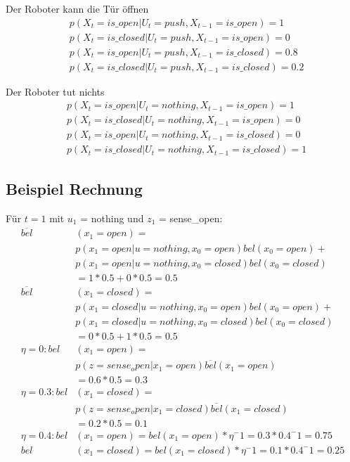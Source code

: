 Der Roboter kann die Tür öffnen
\begin{align*}
	&p(X_t = is\_open | U_t = push, X_{t-1} = is\_open) = 1 \\
	&p(X_t = is\_closed | U_t = push, X_{t-1} = is\_open) = 0 \\
	&p(X_t = is\_open | U_t = push, X_{t-1} = is\_closed) = 0.8 \\
	&p(X_t = is\_closed | U_t = push, X_{t-1} = is\_closed) = 0.2
\end{align*}

Der Roboter tut nichts
\begin{align*}
	&p(X_t = is\_open | U_t = nothing, X_{t-1} = is\_open) = 1 \\
	&p(X_t = is\_closed | U_t = nothing, X_{t-1} = is\_open) = 0 \\
	&p(X_t = is\_open | U_t = nothing, X_{t-1} = is\_closed) = 0 \\
	&p(X_t = is\_closed | U_t = nothing, X_{t-1} = is\_closed) = 1
\end{align*}

\subsection{Beispiel Rechnung}
Für $t=1$ mit $u_1$ = nothing und $z_1$ = sense_open:
\begin{align*}
	\overline{bel}&(x_1 = open) = \\
		&p(x_1 = open | u = nothing, x_0 = open)bel(x_0 = open) + \\
		&p(x_1 = open | u = nothing, x_0 = closed)bel(x_0 = closed) \\
		&= 1 * 0.5 + 0 * 0.5 = 0.5 \\
	\overline{bel}&(x_1 = closed) = \\
		&p(x_1 = closed | u = nothing, x_0 = open)bel(x_0 = open) + \\
		&p(x_1 = closed | u = nothing, x_0 = closed)bel(x_0 = closed) \\
		&= 0 * 0.5 + 1 * 0.5 = 0.5 \\
	\eta = 0: bel&(x_1 = open) =  \\
		&p(z = sense_open | x_1 = open)\overline{bel}(x_1 = open) \\
		&= 0.6 * 0.5 = 0.3 \\
	\eta = 0.3: bel&(x_1 = closed) = \\
		&p(z = sense_open | x_1 = closed)\overline{bel}(x_1 = closed)\\
		&= 0.2 * 0.5 = 0.1 \\
	\eta = 0.4: bel&(x_1 = open) = bel(x_1 = open) * \eta^-1
		= 0.3 * 0.4^-1 = 0.75 \\
	bel&(x_1 = closed) = bel(x_1 = closed) * \eta^-1
		= 0.1 * 0.4^-1 = 0.25
\end{align*}

